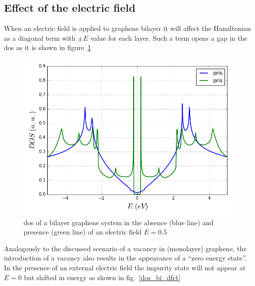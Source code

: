 \subsection{Effect of the electric field}
When an electric field is applied to graphene bilayer it will affect the Hamiltonian as a diagonal term with $\pm E$ value for each layer. Such a term opens a gap in the \ac{dos} as it is shown in figure~\ref{bi_Efield}

\begin{figure}[h!]
  \centering
  \includegraphics{chapter06/figures/bilayer_dos_E.png}
  \vspace{-5pt}
  \caption{\ac{dos} of a bilayer graphene system in the absence (blue line) and presence (green line) of an electric field $E=0.5$} %
  \label{bi_Efield}
\end{figure}
\FloatBarrier

Analogously to the discussed scenario of a vacancy in (monolayer) graphene, the introduction of a vacancy also results in the appearance of a ``zero energy state''. In the presence of an external electric field the impurity state will not appear at $E=0$ but shifted in energy as shown in fig.~\ref{dos_bi_dfct}

